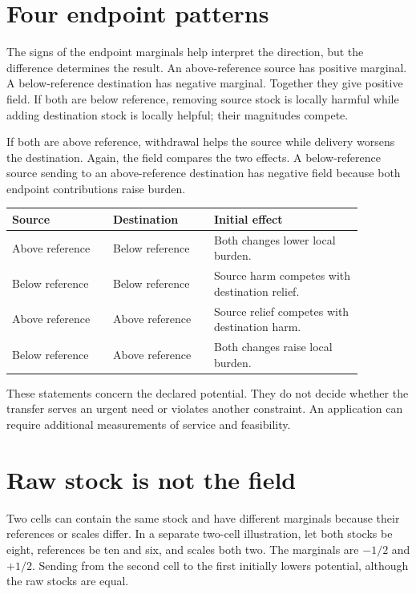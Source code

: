 \section{Four endpoint patterns}
The signs of the endpoint marginals help interpret the direction, but the difference determines the result. An above-reference source has positive marginal. A below-reference destination has negative marginal. Together they give positive field. If both are below reference, removing source stock is locally harmful while adding destination stock is locally helpful; their magnitudes compete.

If both are above reference, withdrawal helps the source while delivery worsens the destination. Again, the field compares the two effects. A below-reference source sending to an above-reference destination has negative field because both endpoint contributions raise burden.

\begin{center}
\begin{tabular}{P{0.25\linewidth}P{0.25\linewidth}P{0.37\linewidth}}
\toprule
Source & Destination & Initial effect\\
\midrule
Above reference & Below reference & Both changes lower local burden.\\
Below reference & Below reference & Source harm competes with destination relief.\\
Above reference & Above reference & Source relief competes with destination harm.\\
Below reference & Above reference & Both changes raise local burden.\\
\bottomrule
\end{tabular}
\end{center}
These statements concern the declared potential. They do not decide whether the transfer serves an urgent need or violates another constraint. An application can require additional measurements of service and feasibility.

\section{Raw stock is not the field}
Two cells can contain the same stock and have different marginals because their references or scales differ. In a separate two-cell illustration, let both stocks be eight, references be ten and six, and scales both two. The marginals are \(-1/2\) and \(+1/2\). Sending from the second cell to the first initially lowers potential, although the raw stocks are equal.

